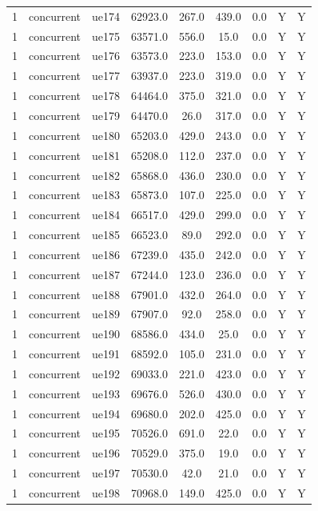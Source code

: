 \begin{table}[ht]
\begin{tabular}{|c|c|c|c|c|c|c|c|c|}
1 & concurrent & ue174 & 62923.0 & 267.0 & 439.0 & 0.0 & Y & Y \\
1 & concurrent & ue175 & 63571.0 & 556.0 & 15.0 & 0.0 & Y & Y \\
1 & concurrent & ue176 & 63573.0 & 223.0 & 153.0 & 0.0 & Y & Y \\
1 & concurrent & ue177 & 63937.0 & 223.0 & 319.0 & 0.0 & Y & Y \\
1 & concurrent & ue178 & 64464.0 & 375.0 & 321.0 & 0.0 & Y & Y \\
1 & concurrent & ue179 & 64470.0 & 26.0 & 317.0 & 0.0 & Y & Y \\
1 & concurrent & ue180 & 65203.0 & 429.0 & 243.0 & 0.0 & Y & Y \\
1 & concurrent & ue181 & 65208.0 & 112.0 & 237.0 & 0.0 & Y & Y \\
1 & concurrent & ue182 & 65868.0 & 436.0 & 230.0 & 0.0 & Y & Y \\
1 & concurrent & ue183 & 65873.0 & 107.0 & 225.0 & 0.0 & Y & Y \\
1 & concurrent & ue184 & 66517.0 & 429.0 & 299.0 & 0.0 & Y & Y \\
1 & concurrent & ue185 & 66523.0 & 89.0 & 292.0 & 0.0 & Y & Y \\
1 & concurrent & ue186 & 67239.0 & 435.0 & 242.0 & 0.0 & Y & Y \\
1 & concurrent & ue187 & 67244.0 & 123.0 & 236.0 & 0.0 & Y & Y \\
1 & concurrent & ue188 & 67901.0 & 432.0 & 264.0 & 0.0 & Y & Y \\
1 & concurrent & ue189 & 67907.0 & 92.0 & 258.0 & 0.0 & Y & Y \\
1 & concurrent & ue190 & 68586.0 & 434.0 & 25.0 & 0.0 & Y & Y \\
1 & concurrent & ue191 & 68592.0 & 105.0 & 231.0 & 0.0 & Y & Y \\
1 & concurrent & ue192 & 69033.0 & 221.0 & 423.0 & 0.0 & Y & Y \\
1 & concurrent & ue193 & 69676.0 & 526.0 & 430.0 & 0.0 & Y & Y \\
1 & concurrent & ue194 & 69680.0 & 202.0 & 425.0 & 0.0 & Y & Y \\
1 & concurrent & ue195 & 70526.0 & 691.0 & 22.0 & 0.0 & Y & Y \\
1 & concurrent & ue196 & 70529.0 & 375.0 & 19.0 & 0.0 & Y & Y \\
1 & concurrent & ue197 & 70530.0 & 42.0 & 21.0 & 0.0 & Y & Y \\
1 & concurrent & ue198 & 70968.0 & 149.0 & 425.0 & 0.0 & Y & Y \\

\end{tabular}
\end{table}
